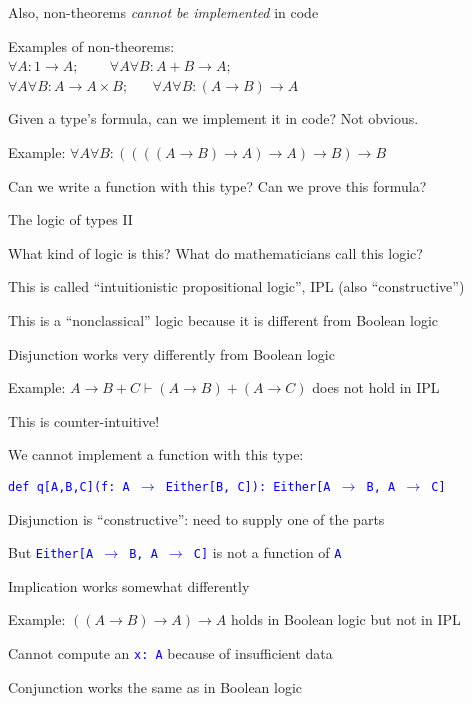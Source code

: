 Also, non-theorems \emph{cannot be implemented} in code 

Examples of non-theorems:\\
 $\forall A:1\rightarrow A$; \  \  $\quad\forall A\forall B:A+B\rightarrow A$;
\\
$\forall A\forall B:A\rightarrow A\times B$; \  $\quad\forall A\forall B:(A\rightarrow B)\rightarrow A$

Given a type\textsf{'}s formula, can we implement it in code? Not obvious.

Example: $\forall A\forall B:((((A\rightarrow B)\rightarrow A)\rightarrow A)\rightarrow B)\rightarrow B$

Can we write a function with this type? Can we prove this formula?

The logic of types II

What kind of logic is this? What do mathematicians call this logic?

This is called \textsf{``}intuitionistic propositional logic\textsf{''}, IPL (also
\textsf{``}constructive\textsf{''})

This is a \textsf{``}nonclassical\textsf{''} logic because it is different from Boolean
logic

Disjunction works very differently from Boolean logic

Example: $A\rightarrow B+C\vdash(A\rightarrow B)+(A\rightarrow C)$
does not hold in IPL

This is counter-intuitive!

We cannot implement a function with this type:

\texttt{\textcolor{blue}{\footnotesize{}def q{[}A,B,C{]}(f: A $\rightarrow$
Either{[}B, C{]}): Either{[}A $\rightarrow$ B, A $\rightarrow$ C{]}}}{\footnotesize\par}

Disjunction is \textsf{``}constructive\textsf{''}: need to supply one of the parts

But \texttt{\textcolor{blue}{\footnotesize{}Either{[}A $\rightarrow$
B, A $\rightarrow$ C{]}}} is not a function of \texttt{\textcolor{blue}{\footnotesize{}A}} 

Implication works somewhat differently

Example: $\left(\left(A\rightarrow B\right)\rightarrow A\right)\rightarrow A$
holds in Boolean logic but not in IPL

Cannot compute an \texttt{\textcolor{blue}{\footnotesize{}x:\ A}}
because of insufficient data

Conjunction works the same as in Boolean logic

